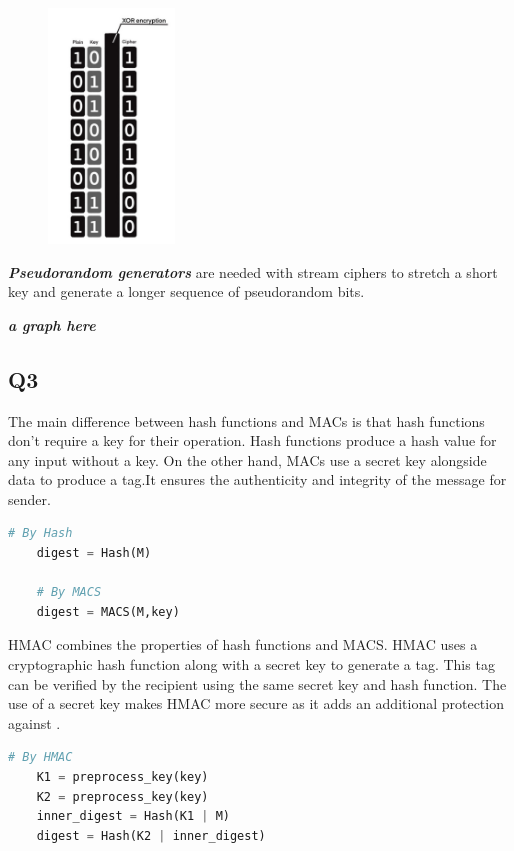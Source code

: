 \documentclass{article}
\begin{document}
    \begin{figure}[htbp]
        \centering %
        \includegraphics[width=0.3\textwidth]{graphs/Stream_cipher.jpg} 
    \end{figure}

	\textbf{\textit{Pseudorandom generators}} are needed with stream ciphers to stretch a short key and generate a longer sequence of pseudorandom bits\cite{3-1.Symmetric-Crypto}. 
	\begin{center}
		\textbf{\textit{a graph here}}
	\end{center}

\newpage

\subsection{Q3}
	The main difference between hash functions and MACs is that hash functions don't require a key for their operation. Hash functions produce a hash value for any input without a key. On the other hand, MACs use a secret key alongside data to produce a tag.It ensures the authenticity and integrity of the message for sender\cite{3-1.Symmetric-Crypto}.

	\begin{lstlisting}[language=Python]
	# By Hash
	digest = Hash(M)

	# By MACS
	digest = MACS(M,key)
	\end{lstlisting}

	HMAC combines the properties of hash functions and MACS. HMAC uses a cryptographic hash function along with a secret key to generate a tag. This tag can be verified by the recipient using the same secret key and hash function. The use of a secret key makes HMAC more secure as it adds an additional protection against .

	\begin{lstlisting}[language=Python]
	# By HMAC 
	K1 = preprocess_key(key)
	K2 = preprocess_key(key)
	inner_digest = Hash(K1 | M)
	digest = Hash(K2 | inner_digest)
	\end{lstlisting}
\end{document}
